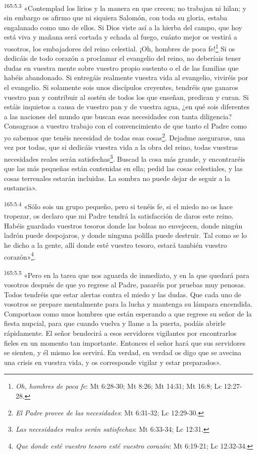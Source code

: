 \par 
\textsuperscript{165:5.3} «Contemplad los lirios y la manera en que crecen; no trabajan ni hilan; y sin embargo os afirmo que ni siquiera Salomón, con toda su gloria, estaba engalanado como uno de ellos. Si Dios viste así a la hierba del campo, que hoy está viva y mañana será cortada y echada al fuego, cuánto mejor os vestirá a vosotros, los embajadores del reino celestial. ¡Oh, hombres de poca fe!\footnote{\textit{Oh, hombres de poca fe}: Mt 6:28-30; Mt 8:26; Mt 14:31; Mt 16:8; Lc 12:27-28.} Si os dedicáis de todo corazón a proclamar el evangelio del reino, no deberíais tener dudas en vuestra mente sobre vuestro propio sustento o el de las familias que habéis abandonado. Si entregáis realmente vuestra vida al evangelio, viviréis por el evangelio. Si solamente sois unos discípulos creyentes, tendréis que ganaros vuestro pan y contribuir al sostén de todos los que enseñan, predican y curan. Si estáis inquietos a causa de vuestro pan y de vuestra agua, ¿en qué sois diferentes a las naciones del mundo que buscan esas necesidades con tanta diligencia? Consagraos a vuestro trabajo con el convencimiento de que tanto el Padre como yo sabemos que tenéis necesidad de todas esas cosas\footnote{\textit{El Padre provee de las necesidades}: Mt 6:31-32; Lc 12:29-30.}. Dejadme aseguraros, una vez por todas, que si dedicáis vuestra vida a la obra del reino, todas vuestras necesidades reales serán satisfechas\footnote{\textit{Las necesidades reales serán satisfechas}: Mt 6:33-34; Lc 12:31.}. Buscad la cosa más grande, y encontraréis que las más pequeñas están contenidas en ella; pedid las cosas celestiales, y las cosas terrenales estarán incluidas. La sombra no puede dejar de seguir a la sustancia».

\par 
\textsuperscript{165:5.4} «Sólo sois un grupo pequeño, pero si tenéis fe, si el miedo no os hace tropezar, os declaro que mi Padre tendrá la satisfacción de daros este reino. Habéis guardado vuestros tesoros donde las bolsas no envejecen, donde ningún ladrón puede despojaros, y donde ninguna polilla puede destruir. Tal como se lo he dicho a la gente, allí donde esté vuestro tesoro, estará también vuestro corazón»\footnote{\textit{Que donde esté vuestro tesoro esté vuestro corazón}: Mt 6:19-21; Lc 12:32-34.}.

\par 
\textsuperscript{165:5.5} «Pero en la tarea que nos aguarda de inmediato, y en la que quedará para vosotros después de que yo regrese al Padre, pasaréis por pruebas muy penosas. Todos tendréis que estar alertas contra el miedo y las dudas. Que cada uno de vosotros se prepare mentalmente para la lucha y mantenga su lámpara encendida. Comportaos como unos hombres que están esperando a que regrese su señor de la fiesta nupcial, para que cuando vuelva y llame a la puerta, podáis abrirle rápidamente. El señor bendecirá a esos servidores vigilantes por encontrarlos fieles en un momento tan importante. Entonces el señor hará que sus servidores se sienten, y él mismo los servirá. En verdad, en verdad os digo que se avecina una crisis en vuestra vida, y os corresponde vigilar y estar preparados».

